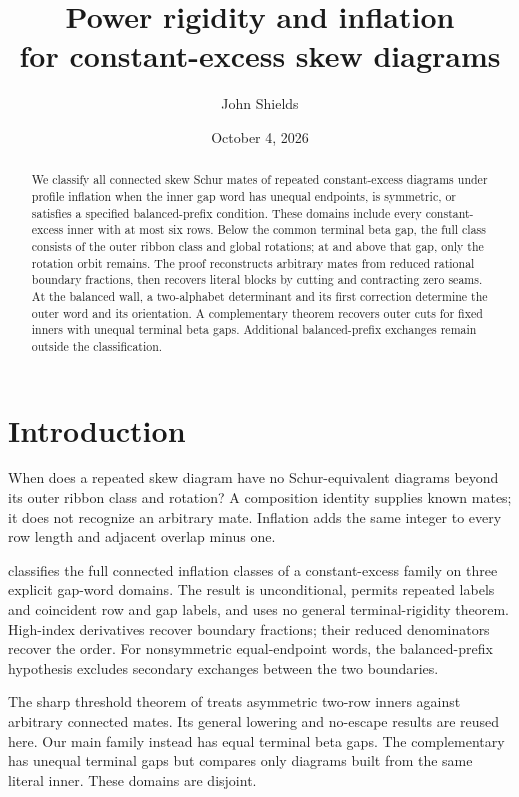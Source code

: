 \documentclass[11pt,a4paper]{amsart}
\title[Power rigidity and inflation]
{Power rigidity and inflation\\
for constant-excess skew diagrams}
\author{John Shields}
\date{October 4, 2026}
\numberwithin{equation}{section}
\theoremstyle{plain}
\theoremstyle{definition}
\begin{document}
\begin{abstract}
We classify all connected skew Schur mates of repeated constant-excess diagrams under profile inflation when the inner gap word has unequal endpoints, is symmetric, or satisfies a specified balanced-prefix condition.  These domains include every constant-excess inner with at most six rows.  Below the common terminal beta gap, the full class consists of the outer ribbon class and global rotations; at and above that gap, only the rotation orbit remains.  The proof reconstructs arbitrary mates from reduced rational boundary fractions, then recovers literal blocks by cutting and contracting zero seams.  At the balanced wall, a two-alphabet determinant and its first correction determine the outer word and its orientation.  A complementary theorem recovers outer cuts for fixed inners with unequal terminal beta gaps.  Additional balanced-prefix exchanges remain outside the classification.
\end{abstract}

\maketitle

\section{Introduction}\label{sec:introduction}

When does a repeated skew diagram have no Schur-equivalent diagrams beyond
its outer ribbon class and rotation?  A composition identity supplies
known mates; it does not recognize an arbitrary mate.  Inflation adds the
same integer to every row length and adjacent overlap minus one.

\label{sec:status}
 classifies the full connected inflation classes of a
constant-excess family on three explicit gap-word domains.  The result is
unconditional, permits repeated labels and coincident row and gap labels,
and uses no general terminal-rigidity theorem.  High-index derivatives
recover boundary fractions; their reduced denominators recover the order.
For nonsymmetric equal-endpoint words, the balanced-prefix hypothesis
excludes secondary exchanges between the two boundaries.

The sharp threshold theorem of \cite{Shields2026Inflation} treats
asymmetric two-row inners against arbitrary connected mates.  Its general
lowering and no-escape results are reused here.  Our main family instead
has equal terminal beta gaps.  The complementary
 has unequal terminal gaps but compares only
diagrams built from the same literal inner.  These domains are disjoint.
\end{document}
